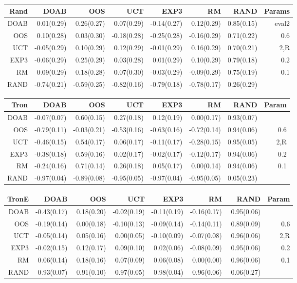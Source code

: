 \begin{figure}
\begin{tiny}
\begin{tabular}{|r|rrrrrr|r|}\hline
Rand&DOAB&OOS&UCT&EXP3&RM&RAND&Params\\\hline
DOAB&0.01(0.29)&0.26(0.27)&0.07(0.29)&-0.14(0.27)&0.12(0.29)&0.85(0.15)&eval2\\
OOS&0.10(0.28)&0.03(0.30)&-0.18(0.28)&-0.25(0.28)&-0.16(0.29)&0.71(0.22)&0.6\\
UCT&-0.05(0.29)&0.10(0.29)&0.12(0.29)&-0.01(0.29)&0.16(0.29)&0.70(0.21)&2,R\\
EXP3&-0.06(0.29)&0.25(0.29)&0.03(0.28)&0.01(0.29)&0.10(0.29)&0.79(0.18)&0.2\\
RM&0.09(0.29)&0.18(0.28)&0.07(0.30)&-0.03(0.29)&-0.09(0.29)&0.75(0.19)&0.1\\
RAND&-0.74(0.21)&-0.59(0.25)&-0.82(0.16)&-0.79(0.18)&-0.78(0.17)&0.26(0.29)&\\
\hline
\end{tabular}

\begin{tabular}{|r|rrrrrr|r|}\hline
Tron&DOAB&OOS&UCT&EXP3&RM&RAND&Param\\\hline
DOAB&-0.07(0.07)&0.60(0.15)&0.27(0.18)&0.12(0.19)&0.00(0.17)&0.93(0.07)&\\
OOS&-0.79(0.11)&-0.03(0.21)&-0.53(0.16)&-0.63(0.16)&-0.72(0.14)&0.94(0.06)&0.6\\
UCT&-0.46(0.15)&0.54(0.17)&0.06(0.17)&-0.11(0.17)&-0.28(0.15)&0.95(0.05)&2,R\\
EXP3&-0.38(0.18)&0.59(0.16)&0.02(0.17)&-0.02(0.17)&-0.12(0.17)&0.94(0.06)&0.2\\
RM&-0.24(0.16)&0.71(0.14)&0.26(0.18)&0.05(0.17)&0.00(0.14)&0.94(0.06)&0.1\\
RAND&-0.97(0.04)&-0.89(0.08)&-0.95(0.05)&-0.97(0.04)&-0.95(0.05)&0.05(0.23)&\\\hline
\end{tabular}

\begin{tabular}{|r|rrrrrr|r|}\hline
TronE&DOAB&OOS&UCT&EXP3&RM&RAND&Param\\\hline
DOAB&-0.43(0.17)&0.18(0.20)&-0.02(0.19)&-0.11(0.19)&-0.16(0.17)&0.95(0.06)&\\
OOS&-0.19(0.14)&0.00(0.18)&-0.10(0.13)&-0.09(0.14)&-0.14(0.11)&0.89(0.09)&0.6\\
UCT&-0.05(0.14)&0.05(0.16)&0.00(0.05)&-0.10(0.09)&-0.07(0.08)&0.96(0.06)&2,R\\
EXP3&-0.02(0.15)&0.12(0.17)&0.09(0.10)&0.02(0.06)&-0.08(0.09)&0.95(0.06)&0.2\\
RM&0.06(0.14)&0.18(0.16)&0.07(0.09)&0.06(0.08)&0.00(0.00)&0.96(0.06)&0.1\\
RAND&-0.93(0.07)&-0.91(0.10)&-0.97(0.05)&-0.98(0.04)&-0.96(0.06)&-0.06(0.27)&\\\hline
\end{tabular}


\end{tiny}
\end{figure}
